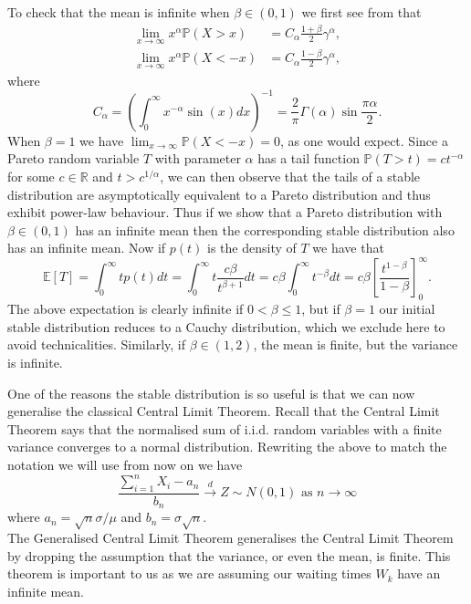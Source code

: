 \documentclass[honours,12pt,twoside, openright]{unswthesis}
\newcommand{\R}{\mathbb{R}}
\newcommand{\PP}{\mathbb{P}}
\newcommand{\E}{\mathbb{E}}
\newcommand{\1}{\mathbf 1}
\numberwithin{equation}{section}
\theoremstyle{definition}
\theoremstyle{remark}
\begin{document}
\noindent To check that the mean is infinite when $\beta \in (0,1)$ we first see from \cite{JanickiWeron1994} that 
\begin{align}\label{eq:asymptoticPareto}
\lim_{x\to\infty} x^\alpha\PP(X>x)&=C_\alpha\frac{1+\beta}{2}\gamma^\alpha,\\
\lim_{x\to\infty} x^\alpha\PP(X<-x)&=C_\alpha\frac{1-\beta}{2}\gamma^\alpha,
\end{align}
\noindent where
\[
	C_\alpha=\left(\int^\infty_0 x^{-\alpha} \sin(x) dx  \right)^{-1}=\frac{2}{\pi}\Gamma(\alpha)\sin\frac{\pi\alpha}{2}.
\]
\noindent When $\beta=1$ we have $\lim_{x\to\infty}\PP(X<-x)=0$, as one would expect. Since a Pareto random variable $T$ with parameter $\alpha$ has a tail function $\PP(T>t)=ct^{-\alpha}$ for some $c\in \R$ and $t>c^{1/\alpha}$, we can then observe that the tails of a stable distribution are asymptotically equivalent to a Pareto distribution and thus exhibit power-law behaviour. 
Thus if we show that a Pareto distribution with $\beta \in (0,1)$ has an infinite mean then the corresponding stable distribution also has an infinite mean. Now if $p(t)$ is the density of $T$ we have that 
\[
	\E[T]=\int^\infty_0 tp(t)dt = \int^\infty_0 t\frac{c\beta}{t^{\beta+1}}dt = c\beta\int^\infty_0 t^{-\beta}dt = c\beta \left[\frac{t^{1-\beta}}{1-\beta}\right]^\infty_0.
\]
The above expectation is clearly infinite if $0<\beta\leq1$, but if $\beta=1$ our initial stable distribution reduces to a Cauchy distribution, which we exclude here to avoid technicalities.
Similarly, if $\beta \in (1,2)$, the mean is finite, but the variance is infinite.


One of the reasons the stable distribution is so useful is that we can now generalise the classical Central Limit Theorem. Recall that the Central Limit Theorem says that the normalised sum of i.i.d. random variables with a finite variance converges to a normal distribution. Rewriting the above to match the notation we will use from now on we have
\[
	\frac{\sum^n_{i=1}X_i-a_n}{b_n} \overset{d}{\to}Z \sim N(0,1) \textrm{ as $n\to\infty$}
\]
where $a_n=\sqrt{n}\sigma/\mu$ and $b_n=\sigma\sqrt{n}.$\\

\noindent The Generalised Central Limit Theorem generalises the Central Limit Theorem by dropping the assumption that the variance, or even the mean, is finite. This theorem is important to us as we are assuming our waiting times $W_k$ have an infinite mean.\\
\end{document}
